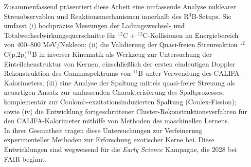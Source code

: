 Zusammenfassend präsentiert diese Arbeit eine umfassende Analyse nuklearer Streuobservablen und Reaktionsmechanismen innerhalb des R$^3$B-Setups. Sie umfasst (i) hochpräzise Messungen der Ladungs\-wechsel- und Totalwechselwirkungsquerschnitte für $^{12}$C + $^{12}$C-Kollisionen im Energiebereich von 400–800 MeV/Nukleon; (ii) die Validierung der Quasi-freien Streureaktion $^{12}$C(p,2p)$^{11}$B in inverser Kinematik als Werkzeug zur Untersuchung der Einteilchenstruktur von Kernen, einschließlich der ersten eindeutigen Doppler Rekonstruktion des Gammaspektrums von  $^{11}$B unter Verwendung des CALIFA-Kalorimeters; (iii) eine Analyse der Spaltung mittels quasi-freier Streuung als neuartigen Ansatz zur umfassenden Charakterisierung des Spaltprozesses, komplementär zur Coulomb-exzitationsinduzierten Spaltung (Coulex-Fission); sowie (iv) die Entwicklung fortgeschrittener Cluster-Rekonstruktionsverfahren für den CALIFA-Kalorimeter mithilfe von Methoden des maschinellen Lernens.\\
In ihrer Gesamtheit tragen diese Untersuchungen zur Verfeinerung experimenteller Methoden zur Erforschung exotischer Kerne bei. Diese Entwicklungen sind wegweisend für die \textit{Early Science} Kampagne, die 2028 bei FAIR beginnt.

